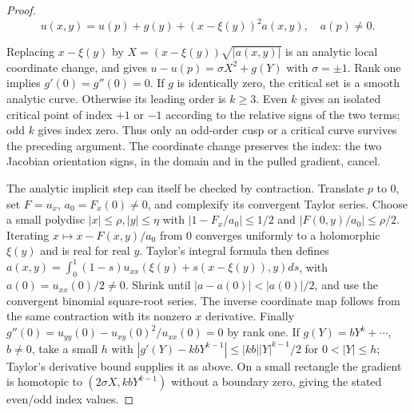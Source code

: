 \documentclass[11pt]{article}
\theoremstyle{definition}
\theoremstyle{remark}
\numberwithin{equation}{section}
\begin{document}
\begin{proof}
\begin{equation}\label{eq:src-6-01}
u(x,y)=u(p)+g(y)+(x-\xi(y))^2a(x,y),\quad a(p)\ne0.
\end{equation}

Replacing $x-\xi(y)$ by $X=(x-\xi(y))\sqrt{|a(x,y)|}$ is an analytic local coordinate change, and gives $u-u(p)=\sigma X^2+g(Y)$ with $\sigma=\pm1$. Rank one implies $g'(0)=g''(0)=0$. If $g$ is identically zero, the critical set is a smooth analytic curve. Otherwise its leading order is $k\ge3$. Even $k$ gives an isolated critical point of index $+1$ or $-1$ according to the relative signs of the two terms; odd $k$ gives index zero. Thus only an odd-order cusp or a critical curve survives the preceding argument. The coordinate change preserves the index: the two Jacobian orientation signs, in the domain and in the pulled gradient, cancel.

The analytic implicit step can itself be checked by contraction. Translate $p$ to 0, set $F=u_x$, $a_0=F_x(0)\ne0$, and complexify its convergent Taylor series. Choose a small polydisc $|x|\le\rho,|y|\le\eta$ with $|1-F_x/a_0|\le1/2$ and $|F(0,y)/a_0|\le\rho/2$. Iterating $x\mapsto x-F(x,y)/a_0$ from 0 converges uniformly to a holomorphic $\xi(y)$ and is real for real $y$. Taylor's integral formula then defines $a(x,y)=\int_0^1(1-s)u_{xx}(\xi(y)+s(x-\xi(y)),y)ds$, with $a(0)=u_{xx}(0)/2\ne0$. Shrink until $|a-a(0)|<|a(0)|/2$, and use the convergent binomial square-root series. The inverse coordinate map follows from the same contraction with its nonzero $x$ derivative. Finally $g''(0)=u_{yy}(0)-u_{xy}(0)^2/u_{xx}(0)=0$ by rank one. If $g(Y)=bY^k+\cdots$, $b\ne0$, take a small $h$ with $|g'(Y)-kbY^{k-1}|\le|kb||Y|^{k-1}/2$ for $0<|Y|\le h$; Taylor's derivative bound supplies it as above. On a small rectangle the gradient is homotopic to $(2\sigma X,kbY^{k-1})$ without a boundary zero, giving the stated even/odd index values.

\end{proof}
\end{document}
